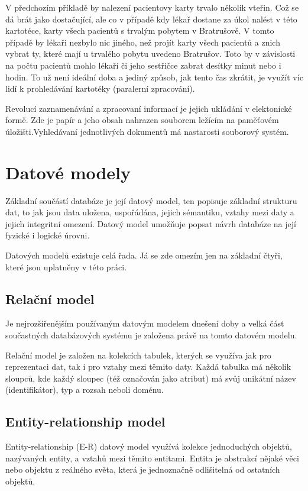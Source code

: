 V předchozím příkladě by nalezení pacientovy karty trvalo několik vteřin. Což se dá brát jako dostačující, ale co v případě kdy lékař dostane za úkol nalést v této kartotéce, karty všech pacientů s trvalým pobytem v Bratrušově. V tomto případě by lékaři nezbylo nic jiného, než projít karty všech pacientů a znich vybrat ty, které mají u trvalého pobytu uvedeno Bratrušov. Toto by v závislosti na počtu pacientů mohlo lékaří či jeho sestřičce zabrat desítky minut nebo i hodin. To už není ideální doba a jediný způsob, jak tento čas zkrátit, je využít víc lidí k prohledávání kartotéky (paralerní zpracování).

Revolucí zaznamenávání a zpracovaní informací je jejich ukládání v elektonické formě. Zde je papír a jeho obsah nahrazen souborem ležícím na paměťovém úložišti.Vyhledávaní jednotlivých dokumentů má nastarosti souborový systém.
\cite[s.~1--52]{korth:dbsc}

\section{Datové modely}
Základní součástí databáze je její datový model, ten popisuje základní strukturu dat, to jak jsou data uložena, uspořádána, jejich sémantiku, vztahy mezi daty a jejich integritní omezení. Datový model umožňuje popsat návrh databáze na její fyzické i logické úrovni.\cite[s.~945--975]{korth:dbsc}

Datových modelů existuje celá řada. Já se zde omezím jen na základní čtyři, které jsou uplatněny v této práci.

\subsection{Relační model}
Je nejrozšířenějším používaným datovým modelem dnešení doby a velká část součastných databázových systému je založena právě na tomto datovém modelu.

Relační model je založen na kolekcích tabulek, kterých se využíva jak pro reprezentaci dat, tak i pro vztahy mezi těmito daty. Každá tabulka má několik sloupců, kde každý sloupec (též označován jako atribut) má svůj unikátní název (identifikátor), typ a rozsah neboli doménu.
\subsection{Entity-relationship model}
Entity-relationship (E-R) datový model využívá kolekce jednoduchých objektů, nazývaných entity, a vztahů mezi těmito entitami. Entita je abstrakcí nějaké věci nebo objektu z reálného světa, která je jednoznačně odlišitelná od ostatních objektů. 

